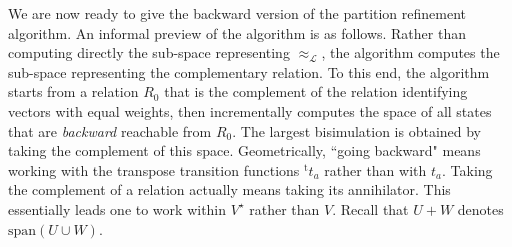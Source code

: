 \documentclass[3p]{elsarticle}
\newcommand{\fL}{\mathcal{L}}    %
\newcommand{\transp}{{}^{\mathrm{t}}}  %
\newcommand{\K}{\mathbb{K}}            %
\newcommand{\dual}[1]{ {#1}^\star}     %
\newcommand{\kernel}{\mathrm{ker}} %
\newcommand{\Span}{\mathrm{span}}  %
\newcommand{\reals}{{\mathbb{R}}}              %
\begin{document}
We are now ready to give the backward version of the partition
refinement algorithm. %
An informal preview of the algorithm is as follows. Rather than
computing directly the sub-space representing $\approx_\fL$, the
algorithm computes the sub-space representing the complementary
relation.  To this end, the algorithm starts from a relation $R_0$
that is the complement of the relation identifying vectors with
equal weights,   then    incrementally  computes the space of all
states that are \emph{backward} reachable from $R_0$. The largest
bisimulation is obtained by taking the complement of this space.
Geometrically,
``going backward" means working with the transpose transition
functions  $\transp   t_a$  rather than with $t_a$. Taking the
complement of a relation  actually means taking its annihilator.
 This essentially leads one to work within $\dual V$ rather than $V$.
  Recall that $U+W$   denotes $\Span(U\cup W)$.
\end{document}

